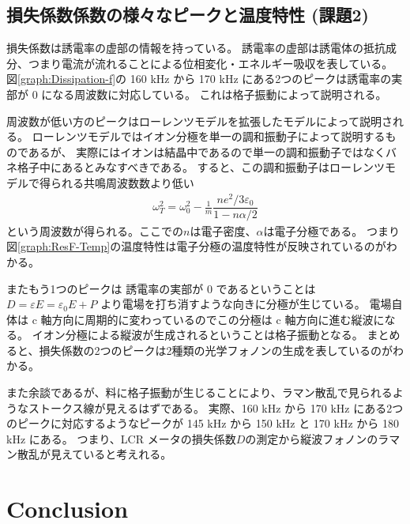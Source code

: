 \documentclass[9pt,dvipdfmx,a4paper]{jsarticle}
\begin{document}
\subsection{損失係数係数の様々なピークと温度特性 (課題2)}
損失係数は誘電率の虚部の情報を持っている。
誘電率の虚部は誘電体の抵抗成分、つまり電流が流れることによる位相変化・エネルギー吸収を表している。
図\ref{graph:Dissipation-f}の 160 kHz から 170 kHz にある2つのピークは誘電率の実部が 0 になる周波数に対応している。
これは格子振動によって説明される。

周波数が低い方のピークはローレンツモデルを拡張したモデルによって説明される。
ローレンツモデルではイオン分極を単一の調和振動子によって説明するものであるが、
実際にはイオンは結晶中であるので単一の調和振動子ではなくバネ格子中にあるとみなすべきである。
すると、この調和振動子はローレンツモデルで得られる共鳴周波数数より低い
\begin{align}
    \omega_T^2 = \omega_0^2 - \frac{1}{m}\dfrac{ne^2 /3\varepsilon_0}{1-n\alpha/2}
\end{align}
という周波数が得られる。ここでの\(n\)は電子密度、\(\alpha\)は電子分極である。
つまり図\ref{graph:ResF-Temp}の温度特性は電子分極の温度特性が反映されているのがわかる。

またもう1つのピークは
誘電率の実部が 0 であるということは\(D = \varepsilon E = \varepsilon_0 E + P\)
より電場を打ち消すような向きに分極が生じている。
電場自体は c 軸方向に周期的に変わっているのでこの分極は c 軸方向に進む縦波になる。
イオン分極による縦波が生成されるということは格子振動となる。
まとめると、損失係数の2つのピークは2種類の光学フォノンの生成を表しているのがわかる。

また余談であるが、料に格子振動が生じることにより、ラマン散乱で見られるようなストークス線が見えるはずである。
実際、160 kHz から 170 kHz にある2つのピークに対応するようなピークが 145 kHz から 150 kHz と 170 kHz から 180 kHz にある。
つまり、LCR メータの損失係数\(D\)の測定から縦波フォノンのラマン散乱が見えていると考えれる。



\section{Conclusion}



\nocite{*}

\appendix
\end{document}

